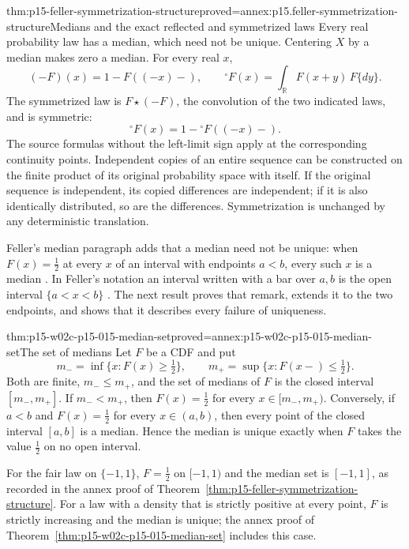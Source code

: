 \begin{hbtheorem}{thm:p15-feller-symmetrization-structure}{proved=annex:p15.feller-symmetrization-structure}{Medians and the exact reflected and symmetrized laws}
Every real probability law has a median, which need not be unique.
Centering \(X\) by a median makes zero a median.
For every real \(x\),
\[
 (-F)(x)=1-F((-x)-),\qquad
 {}^{\circ}F(x)=\int_{\mathbb R}F(x+y)\,F\{dy\}.
\]
The symmetrized law is \(F\star(-F)\), the convolution of the
two indicated laws, and is symmetric:
\[
 {}^{\circ}F(x)=1-{}^{\circ}F((-x)-).
\]
The source formulas without the left-limit sign apply at the
corresponding continuity points.
Independent copies of an entire sequence can be constructed on the
finite product of its original probability space with itself. If the
original sequence is independent, its copied differences are independent;
if it is also identically distributed, so are the differences.
Symmetrization is unchanged by any deterministic translation.
\end{hbtheorem}

Feller's median paragraph adds that a median need not be unique: when
\(F(x)=\tfrac12\) at every \(x\) of an interval with endpoints \(a<b\),
every such \(x\) is a median
\cite[V.2, p.~137]{Feller1971ProbabilityII}. In Feller's notation an
interval written with a bar over \(a,b\) is the open interval
\(\{a<x<b\}\) \cite[I.2, p.~4]{Feller1971ProbabilityII}. The next result
proves that remark, extends it to the two endpoints, and shows that it
describes every failure of uniqueness.

\begin{hbtheorem}{thm:p15-w02c-p15-015-median-set}{proved=annex:p15-w02c-p15-015-median-set}{The set of medians}
Let \(F\) be a CDF and put
\[
 m_-=\inf\{x:F(x)\geq\tfrac12\},\qquad
 m_+=\sup\{x:F(x-)\leq\tfrac12\}.
\]
Both are finite, \(m_-\leq m_+\), and the set of medians of \(F\) is
the closed interval \([m_-,m_+]\). If \(m_-<m_+\), then
\(F(x)=\tfrac12\) for every \(x\in[m_-,m_+)\).
Conversely, if \(a<b\) and \(F(x)=\tfrac12\) for every
\(x\in(a,b)\), then every point of the closed interval \([a,b]\) is a
median. Hence the median is unique exactly when \(F\) takes the value
\(\tfrac12\) on no open interval.
\end{hbtheorem}

For the fair law on \(\{-1,1\}\), \(F=\tfrac12\) on \([-1,1)\) and the
median set is \([-1,1]\), as recorded in the annex proof of
Theorem~\ref{thm:p15-feller-symmetrization-structure}. For a law with a
density that is strictly positive at every point, \(F\) is strictly
increasing and the median is unique; the annex proof of
Theorem~\ref{thm:p15-w02c-p15-015-median-set} includes this case.

